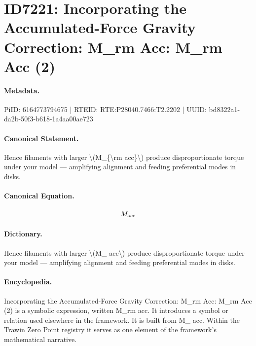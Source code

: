 \section*{ID7221: Incorporating the Accumulated-Force Gravity Correction: M\_rm Acc: M\_rm Acc (2)}
\paragraph{Metadata.}
PiID: 6164773794675 | RTEID: RTE:P28040.7466:T2.2202 | UUID: bd8322a1-da2b-50f3-b618-1a4aa00ae723

\paragraph{Canonical Statement.}
Hence filaments with larger \textbackslash{}(M\_\{\textbackslash{}rm acc\}\textbackslash{}) produce disproportionate torque under your model — amplifying alignment and feeding preferential modes in disks.

\paragraph{Canonical Equation.}
\[
M_{\rm acc}
\]

\paragraph{Dictionary.}
Hence filaments with larger \textbackslash{}(M\_ acc\textbackslash{}) produce disproportionate torque under your model — amplifying alignment and feeding preferential modes in disks.

\paragraph{Encyclopedia.}
Incorporating the Accumulated-Force Gravity Correction: M\_rm Acc: M\_rm Acc (2) is a symbolic expression, written M\_rm acc. It introduces a symbol or relation used elsewhere in the framework. It is built from M\_ acc. Within the Trawin Zero Point registry it serves as one element of the framework's mathematical narrative.
